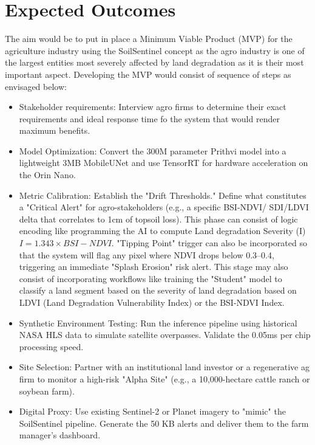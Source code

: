 \documentclass[11pt,letterpaper]{article}
\theoremstyle{plain}
\theoremstyle{definition}
\theoremstyle{remark}
\begin{document}
\section{Expected Outcomes} 
The aim would be to put in place a Minimum Viable Product (MVP) for the agriculture industry using the SoilSentinel concept as the agro industry is one of the largest entities most severely affected by land degradation as it is their most important aspect. Developing the MVP would consist of sequence of steps as envisaged below:
\begin{itemize}
    \item Stakeholder requirements: Interview agro firms to determine their exact requirements and ideal response time fo the system that would render maximum benefits.
    \item Model Optimization: Convert the 300M parameter Prithvi model into a lightweight 3MB MobileUNet and use TensorRT for hardware acceleration on the Orin Nano.
    \item Metric Calibration: Establish the "Drift Thresholds." Define what constitutes a "Critical Alert" for agro-stakeholders (e.g., a specific BSI-NDVI/ SDI/LDVI delta that correlates to 1cm of topsoil loss). This phase can consist of logic encoding like programming the AI to compute Land degradation Severity (I) $I = 1.343 \times BSI - NDVI$. "Tipping Point" trigger can also be incorporated so that the system will flag any pixel where NDVI drops below 0.3–0.4, triggering an immediate "Splash Erosion" risk alert. This stage may also consist of incorporating workflows like training the "Student" model to classify a land segment based on the severity of land degradation based on LDVI (Land Degradation Vulnerability Index) or the BSI-NDVI Index.
    \item Synthetic Environment Testing: Run the inference pipeline using historical NASA HLS data to simulate satellite overpasses. Validate the 0.05ms per chip processing speed.
    \item Site Selection: Partner with an institutional land investor or a regenerative ag firm to monitor a high-risk "Alpha Site" (e.g., a 10,000-hectare cattle ranch or soybean farm).
    \item Digital Proxy: Use existing Sentinel-2 or Planet imagery to "mimic" the SoilSentinel pipeline. Generate the 50 KB alerts and deliver them to the farm manager's dashboard.

\end{itemize}
\end{document}
